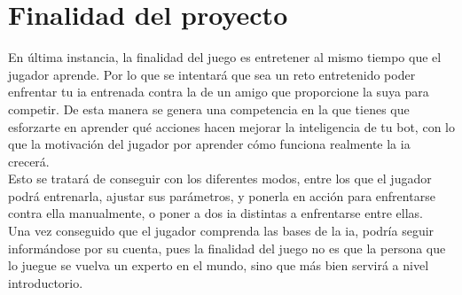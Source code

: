 \section{Finalidad del proyecto}
En última instancia, la finalidad del juego es entretener al mismo tiempo que el jugador aprende. Por lo que se intentará que sea un reto entretenido poder enfrentar tu \gls{ia} entrenada contra la de un amigo que proporcione la suya para competir. De esta manera se genera una competencia en la que tienes que esforzarte en aprender qué acciones hacen mejorar la inteligencia de tu bot, con lo que la motivación del jugador por aprender cómo funciona realmente la \gls{ia} crecerá.
\\
Esto se tratará de conseguir con los diferentes modos, entre los que el jugador podrá entrenarla, ajustar sus parámetros, y ponerla en acción para enfrentarse contra ella manualmente, o poner a dos \gls{ia} distintas a enfrentarse entre ellas.
\\
Una vez conseguido que el jugador comprenda las bases de la \gls{ia}, podría seguir informándose por su cuenta, pues la finalidad del juego no es que la persona que lo juegue se vuelva un experto en el mundo, sino que más bien servirá a nivel introductorio. 
